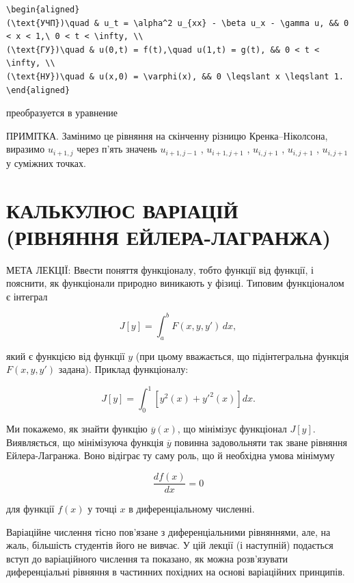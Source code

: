 \documentclass[
  ukrainian,
]{article}
\begin{document}
\begin{verbatim}
\begin{aligned}
(\text{УЧП})\quad & u_t = \alpha^2 u_{xx} - \beta u_x - \gamma u, && 0 < x < 1,\ 0 < t < \infty, \\
(\text{ГУ})\quad & u(0,t) = f(t),\quad u(1,t) = g(t), && 0 < t < \infty, \\
(\text{НУ})\quad & u(x,0) = \varphi(x), && 0 \leqslant x \leqslant 1.
\end{aligned}
\end{verbatim}

преобразуется в уравнение

ПРИМІТКА. Замінимо це рівняння на скінченну різницю Кренка--Ніколсона,
виразимо \(u_{i+1,j}\) через п'ять значень \(u_{i+1,j-1}\) ,
\(u_{i+1,j+1}\) , \(u_{i,j+1}\) , \(u_{i,j+1}\) , \(u_{i,j+1}\) у
суміжних точках.

\section{КАЛЬКУЛЮС ВАРІАЦІЙ (РІВНЯННЯ
ЕЙЛЕРА-ЛАГРАНЖА)}\label{ux43aux430ux43bux44cux43aux443ux43bux44eux441-ux432ux430ux440ux456ux430ux446ux456ux439-ux440ux456ux432ux43dux44fux43dux43dux44f-ux435ux439ux43bux435ux440ux430-ux43bux430ux433ux440ux430ux43dux436ux430}

МЕТА ЛЕКЦІЇ: Ввести поняття функціоналу, тобто функції від функції, і
пояснити, як функціонали природно виникають у фізиці. Типовим
функціоналом є інтеграл

\[
J[y] = \int_a^b F(x, y, y')\,dx,
\]

який є функцією від функції \(y\) (при цьому вважається, що
підінтегральна функція \(F(x, y, y')\) задана). Приклад функціоналу:

\[
J[y] = \int_0^1 \left[y^2(x) + y'^2(x)\right] dx.
\]

Ми покажемо, як знайти функцію \(\overline{y}(x)\), що мінімізує
функціонал \(J[y]\). Виявляється, що мінімізуюча функція
\(\overline{y}\) повинна задовольняти так зване рівняння
Ейлера-Лагранжа. Воно відіграє ту саму роль, що й необхідна умова
мінімуму

\[
\frac{df(x)}{dx} = 0
\]

для функції \(f(x)\) у точці \(x\) в диференціальному численні.

Варіаційне числення тісно пов'язане з диференціальними рівняннями, але,
на жаль, більшість студентів його не вивчає. У цій лекції (і наступній)
подається вступ до варіаційного числення та показано, як можна
розв'язувати диференціальні рівняння в частинних похідних на основі
варіаційних принципів.
\end{document}
